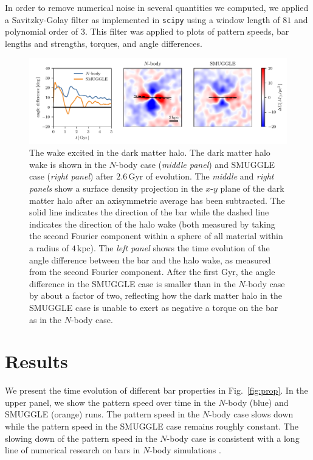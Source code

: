\documentclass[twocolumn,linenumbers]{aastex631}
\newcommand{\Nbody}{$N$-body}
\newcommand{\SMUGGLE}{SMUGGLE}
\begin{document}
In order to remove numerical noise in several quantities we computed, we
applied a Savitzky-Golay filter \citep{1964AnaCh..36.1627S} as implemented in
\texttt{scipy} using a window length of $81$ and polynomial order of $3$. This
filter was applied to plots of pattern speeds, bar lengths and strengths,
torques, and angle differences.

\begin{figure}
    \centering
    \includegraphics[width=\textwidth]{fig/halo_wake.pdf}
    \caption{The wake excited in the dark matter halo. The dark matter halo wake
    is shown in the \Nbody{} case (\textit{middle panel}) and \SMUGGLE{} case
    (\textit{right panel}) after $2.6\,\textrm{Gyr}$ of evolution. The
    \textit{middle} and \textit{right panels} show a surface density projection
    in the $x$-$y$ plane of the dark matter halo after an axisymmetric average
    has been subtracted. The solid line indicates the direction of the bar while
    the dashed line indicates the direction of the halo wake (both measured by
    taking the second Fourier component within a sphere of all material within a
    radius of $4\,\textrm{kpc}$). The \textit{left panel} shows the time
    evolution of the angle difference between the bar and the halo wake, as
    measured from the second Fourier component. After the first Gyr, the angle
    difference in the \SMUGGLE{} case is smaller than in the \Nbody{} case by about
    a factor of two, reflecting how the dark matter halo in the \SMUGGLE{} case is
    unable to exert as negative a torque on the bar as in the \Nbody{} case.}
    \label{fig:wake}
\end{figure}

\section{Results}
\label{sec:results}

We present the time evolution of different bar properties in Fig.~\ref{fig:prop}.
In the upper panel, we show the pattern speed over time in the \Nbody{} (blue)
and \SMUGGLE{} (orange) runs. The pattern speed in the \Nbody{} case slows down
while the pattern speed in the \SMUGGLE{} case remains roughly constant. The
slowing down of the pattern speed in the \Nbody{} case is consistent with a long
line of numerical research on bars in \Nbody{} simulations
\citep{1992ApJ...400...80H, 2000ApJ...543..704D, 2002MNRAS.330...35A,
2002ApJ...569L..83A, 2003MNRAS.341.1179A, 2003MNRAS.346..251O,
2005MNRAS.363..991H, 2006ApJ...637..214M, 2007MNRAS.375..460W,
2009ApJ...697..293D}.
\end{document}
